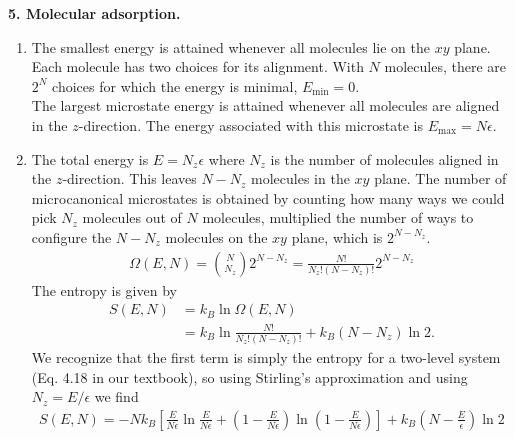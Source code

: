 \documentclass{article}
\theoremstyle{definition}
\newcommand{\f}[2]{\frac{#1}{#2}}
\newcommand{\lp}{\left(}
\newcommand{\rp}{\right)}
\newcommand{\lb}{\left[}
\newcommand{\rb}{\right]}
\begin{document}
\noindent \textbf{5. Molecular adsorption.}

\begin{enumerate}[label=(\alph*)]
	\item The smallest energy is attained whenever all molecules lie on the $xy$ plane. Each molecule has two choices for its alignment. With $N$ molecules, there are $\boxed{2^N}$ choices for which the  energy is minimal, $E_\text{min} = 0$. \\
	
	The largest microstate energy is attained whenever all molecules are aligned in the $z$-direction. The energy associated with this microstate is $\boxed{E_\text{max} = N\epsilon}$. 
	
	\item The total energy is $E = N_z \epsilon$ where $N_z$ is the number of molecules aligned in the $z$-direction. This leaves $N - N_z$ molecules in the $xy$ plane. The number of microcanonical microstates is obtained by counting how many ways we could pick $N_z$ molecules out of $N$ molecules, multiplied the number of ways to configure the $N-N_z$ molecules on the $xy$ plane, which is $2^{N-N_z}$.  
	\begin{align*}
	\Omega(E,N) = {N\choose {N_z}} 2^{N-N_z} = \boxed{\f{N!}{N_z! (N  - N_z)!}2^{N-N_z}}
	\end{align*}
	The entropy is given by 
	\begin{align*}
	S(E,N) 
	&= k_B \ln \Omega(E,N) \\
	&= k_B \ln \f{N!}{N_z! (N-N_z)!} + k_B (N-N_z) \ln 2.
	\end{align*}
	We recognize that the first term is simply the entropy for a two-level system (Eq. 4.18 in our textbook), so using Stirling's approximation and using $N_z = E/\epsilon$ we find 
	\begin{align*}
	\boxed{S(E,N) = -Nk_B \lb \f{E}{N\epsilon}  \ln \f{E}{N\epsilon} + \lp 1 - \f{E}{N\epsilon} \rp \ln \lp 1 - \f{E}{N\epsilon} \rp\rb  + k_B \lp N - \f{E}{\epsilon} \rp \ln 2}
	\end{align*}
	

\end{enumerate}
\end{document}
